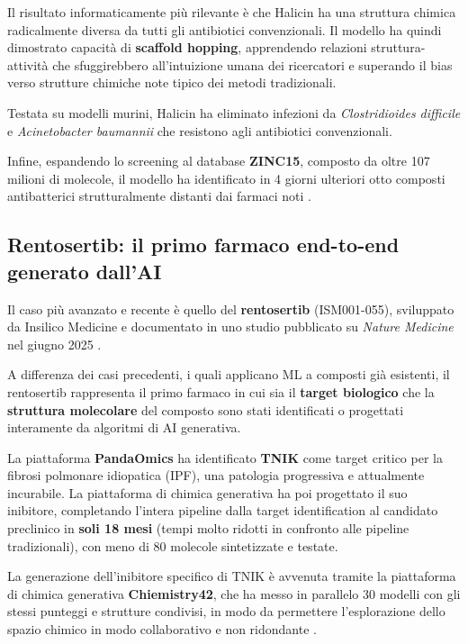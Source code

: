Il risultato informaticamente più rilevante è che 
Halicin ha una struttura chimica radicalmente diversa 
da tutti gli antibiotici convenzionali. Il modello ha quindi dimostrato capacità di \textbf{scaffold hopping},
apprendendo relazioni struttura-attività che sfuggirebbero
all'intuizione umana dei ricercatori e superando il bias
verso strutture chimiche note tipico dei metodi tradizionali.

Testata su modelli murini, 
Halicin ha eliminato infezioni da 
\textit{Clostridioides difficile} e 
\textit{Acinetobacter baumannii} che resistono 
agli antibiotici convenzionali. 


Infine, espandendo lo 
screening al database \textbf{ZINC15}, composto da oltre 107 
milioni di molecole, il modello ha identificato in 4 giorni
ulteriori otto composti antibatterici strutturalmente 
distanti dai farmaci noti \cite{stokesDeepLearningApproach2020}.

\subsection{Rentosertib: il primo farmaco end-to-end 
generato dall'AI}

Il caso più avanzato e recente è quello del 
\textbf{rentosertib} (ISM001-055), sviluppato da 
Insilico Medicine e documentato in uno studio pubblicato su 
\textit{Nature Medicine} nel giugno 2025 
\cite{xuGenerativeAIDiscoveredTNIK2025}.

A differenza dei casi precedenti, i quali applicano ML 
a composti già esistenti, il rentosertib rappresenta 
il primo farmaco in cui sia il \textbf{target biologico} 
che la \textbf{struttura molecolare} del composto sono stati 
identificati o progettati interamente da algoritmi di 
AI generativa. 

La piattaforma \textbf{PandaOmics} ha 
identificato \textbf{TNIK} come target critico per la 
fibrosi polmonare idiopatica (IPF), una patologia 
progressiva e attualmente incurabile. La piattaforma 
di chimica generativa ha poi progettato il suo 
inibitore, completando l'intera pipeline dalla target 
identification al candidato preclinico in 
\textbf{soli 18 mesi} (tempi molto ridotti in confronto alle pipeline tradizionali), con meno di 80 molecole 
sintetizzate e testate.

La generazione dell'inibitore specifico di TNIK è avvenuta tramite la piattaforma di chimica generativa \textbf{Chiemistry42}, che ha messo in parallelo 30 modelli con gli stessi punteggi e strutture condivisi, in modo da permettere l'esplorazione dello spazio chimico in modo collaborativo e non ridondante \cite{renSmallmoleculeTNIKInhibitor2025}.

